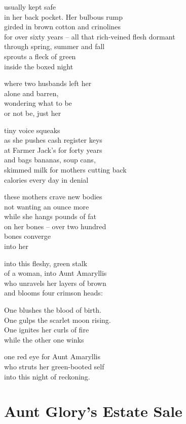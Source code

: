 \documentclass[twoside,10pt]{book}
\begin{document}
usually kept safe\\
in her back pocket. Her bulbous rump\\
girded in brown cotton and crinolines\\
for over sixty years -- all that rich-veined flesh dormant\\
through spring, summer and fall\\
sprouts a fleck of green\\
inside the boxed night

where two husbands left her\\
alone and barren,\\
wondering what to be\\
or not be, just her

tiny voice squeaks\\
as she pushes cash register keys\\
at Farmer Jack's for forty years\\
and bags bananas, soup cans,\\
skimmed milk for mothers cutting back\\
calories every day in denial

these mothers crave new bodies\\
not wanting an ounce more\\
while she hangs pounds of fat\\
on her bones -- over two hundred\\
bones converge\\
into her

into this fleshy, green stalk\\
of a woman, into Aunt Amaryllis\\
who unravels her layers of brown\\
and blooms four crimson heads:

One blushes the blood of birth.\\
One gulps the scarlet moon rising.\\
One ignites her curls of fire\\
while the other one winks

one red eye for Aunt Amaryllis\\
who struts her green-booted self\\
into this night of reckoning.

\clearpage
\section{Aunt Glory's Estate Sale}
\end{document}
